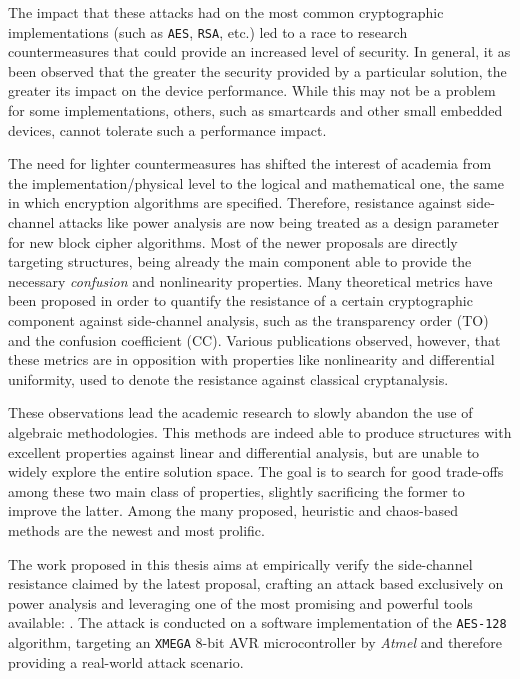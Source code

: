     The impact that these attacks had on the most common cryptographic implementations (such as \texttt{AES}, \texttt{RSA}, etc.) led to a race to research countermeasures that could provide an increased level of security. In general, it as been observed that the greater the security provided by a particular solution, the greater its impact on the device performance. While this may not be a problem for some implementations, others, such as smartcards and other small embedded devices, cannot tolerate such a performance impact.

    The need for lighter countermeasures has shifted the interest of academia from the implementation/physical level to the logical and mathematical one, the same in which encryption algorithms are specified. Therefore, resistance against side-channel attacks like power analysis are now being treated as a design parameter for new block cipher algorithms. Most of the newer proposals are directly targeting \sbocs{} structures, being already the main component able to provide the necessary \emph{confusion} and nonlinearity properties. Many theoretical metrics have been proposed in order to quantify the resistance of a certain cryptographic component against side-channel analysis, such as the transparency order (TO) and the confusion coefficient (CC). Various publications observed, however, that these metrics are in opposition with properties like nonlinearity and differential uniformity, used to denote the resistance against classical cryptanalysis.

    These observations lead the academic research to slowly abandon the use of algebraic methodologies. This methods are indeed able to produce \sbocs{} structures with excellent properties against linear and differential analysis, but are unable to widely explore the entire solution space. The goal is to search for good trade-offs among these two main class of properties, slightly sacrificing the former to improve the latter. Among the many proposed, heuristic and chaos-based methods are the newest and most prolific.

    \bigskip
    \bigskip

    \noindent The work proposed in this thesis aims at empirically verify the side-channel resistance claimed by the latest \sbocs{} proposal, crafting an attack based exclusively on power analysis and leveraging one of the most promising and powerful tools available: \cw{}.
    The attack is conducted on a software implementation of the \texttt{AES-128} algorithm, targeting an \texttt{XMEGA} 8-bit AVR microcontroller by \emph{Atmel} and therefore providing a real-world attack scenario.
    
